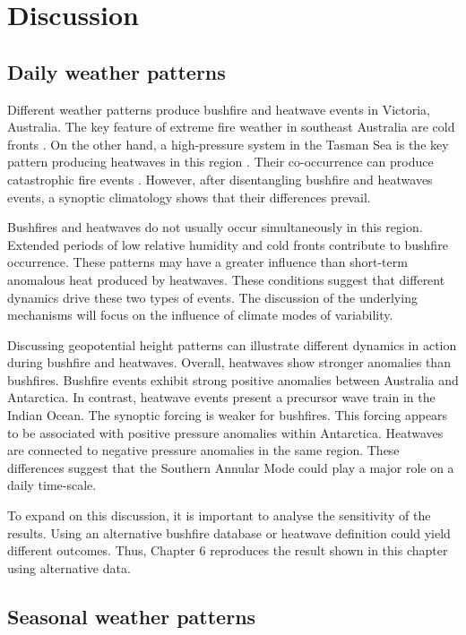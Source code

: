 \section{Discussion}


\subsection{Daily weather patterns}

Different weather patterns produce bushfire and heatwave events in
Victoria, Australia. The key feature of extreme fire weather in southeast
Australia are cold fronts \citep{Reeder1987,Reeder2015}. On the other
hand, a high-pressure system in the Tasman Sea is the key pattern
producing heatwaves in this region \citep{Pezza2012,Parker2014a}.
Their co-occurrence can produce catastrophic fire events \citep{Mills2005,Engel2013}.
However, after disentangling bushfire and heatwaves events, a synoptic
climatology shows that their differences prevail. 

Bushfires and heatwaves do not usually occur simultaneously in this
region. Extended periods of low relative humidity and cold fronts
contribute to bushfire occurrence. These patterns may have a greater
influence than short-term anomalous heat produced by heatwaves. These
conditions suggest that different dynamics drive these two types of
events. The discussion of the underlying mechanisms will focus on
the influence of climate modes of variability. 

Discussing geopotential height patterns can illustrate different dynamics
in action during bushfire and heatwaves. Overall, heatwaves show stronger
anomalies than bushfires. Bushfire events exhibit strong positive
anomalies between Australia and Antarctica. In contrast, heatwave
events present a precursor wave train in the Indian Ocean. The synoptic
forcing is weaker for bushfires. This forcing appears to be associated
with positive pressure anomalies within Antarctica. Heatwaves are
connected to negative pressure anomalies in the same region. These
differences suggest that the Southern Annular Mode could play a major
role on a daily time-scale.

To expand on this discussion, it is important to analyse the sensitivity
of the results. Using an alternative bushfire database or heatwave
definition could yield different outcomes. Thus, Chapter 6 reproduces
the result shown in this chapter using alternative data.


\subsection{Seasonal weather patterns }

